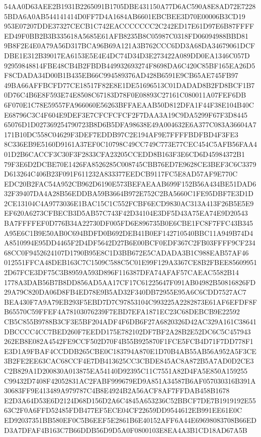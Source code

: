 \documentclass[UTF8,fontset=fandol,zihao=-4,a4paper]{ctexart}
\begin{document}
{{54AA0D63AEE2B1931B2265091B1705DBE431150A77D6AC590A8E8AD72E72285BDA6A0AB544141414D0FF7D4A1684AB6601EBCBEE3D70E00006B3CD19
953E07207DDE37327CECB1C742EACCCCCCC2C242ED17E61D97E6B87FFFFED49F0BB2B3B335618A5685E61AFB8235B8C05987C0318FD06094988BBD81
9B8F2E4E0A79A56D317BCA96B69A121A3B762CCC6DD3A68DA34679061DCFDBE1E312B39017EA6153E5E4E4DC74D34D3E273422A089DD0EA1346C057D
92959848814FBE48CB4B2FBDB449932693274F8698DA6C420C85BF165EA26D5F8CDADA34D00B1B435EB66C994589376AD428B6591E9CB65AE745FB97
49BA66AFFBCFD77CE18517F82E8E1DE51696513C01DADAD8B2FD8BCF1B70D76C4B6E8F593E74E8508C67183D78F0E08893C27161C080011A07FEF6DB
6F070E1C78E59557FA966060E56263BFFAEAAB50D812DFA1F44F38E104B40CE68796C3C4F604E9DEF3E7CFCFCFCF2F7DAA3A19C9DA5299F67F3D8445
65076D1D027369254790723B8D6B5DFA98638E49A004632E6A377C083A36604A7171B10DC558C04629F3DEF7EDDB97C2E194AF9E7FFFFBDFBD4F3FE3
8C336EB9E5160D9161A37EF0C10798C49CC749C773E77CEC454C5AFB56FAA401D2B6CACCF3C30F3F2833CFA23205CCEDD8B163F3E6CD6D45984372B1
79F3E6D2DCBE70E1426FA8526285C008745CBB76ED7E9628CE3BEF3C6C3379D613264C406B23F091F611232A833377EEDCB9117FC5E8AD57AF9E770C
EDC20B2FAC54A952CB962D6190E573BEFAEAAB699F152B56A434BE51DAD632F39407DA4A28B56EDDBA59B3664B972E752C2BA5660C1FE95DBF7E3D1D
2CE13104C4A9773036E1BAC15C1C552FCBF6ECD9830AC313A413F26B5E5E9EF620A6273CFBECB3D5AB57C743F42D34104E3DF5D43A75EA74E9D20543
BA7FFFFEF0D776B34A22730DF005FD6E896735B0E6CBE1FC8F7FFC43B345A95E6C1B9E50AB0C694BDFD0B692DEB41B0EF142710540BBC11A949B74D4
A8510994E95DD4465F2D4DF5642D27B6E00BCF0EDF367C2FB03FFFF9CF23468CC0F9452624107D1790B95E8C1D3BB672E5CADADA3B1C988EAB57AF46
012551FFCA48DEB163C7C1509C588C5C01E99F129A3367CE8B2FBEE856099512D67FCE3DF75C3B8959A593D896F116387DFA74AFAF57CAEAC5582B14
1778A3DAB56B7B8DD856AD5AA17CF17C61225647F091AB04982B50816826FD29A79C820DA06D8FB4ED78E9B5AD32F340DB72955E95A6C6CDD7527AC7
BEA430F7A9A79EB293F5EBD7D7C97853104C993225A2282873E61AF6EFDF8FB65570C59FFEF4A78103076239F7EBD7EFA1871EC23C68DEBCB9E22592
CB5C855B9788B3CF3E5BF204ADF4F6DB6F27A6820326D42AC329A161C38641DBCCCC4CC7BED260F7EEDD175E782102DF7BF2A28B2E52DC6C5C457943
262EB8E082A4542FE9CCF502D70F4B55B925870F1FCE5FCB4D71F7DD778F1E3D1A9FBAF4CCDDB265CBE0C183794A870E1D70B4AB55AB56A952A5F3CE
3B2FE2EE63CAC68CCF4E7DB413625CC3CBDE845AC8A872B5A7AD0D2CE3C2B829A1D200830A013875EA54140D92395C11C7551A82D4FA5E850A159255
C99432D7408F42052831AC2FABF999679ED9A851A34587B6AF057030316B391A30683FF9E413489A979787C4B8E4924B2A56ACF8AF7FFDAB458B1678
E2D3A64D53E6D2124D68D156D2A6C4845A653236C52BBCF7DE7B1919192E5563C2F0A6FFD52485FDB477EF5ECE04CF22659DD9544612EB991EE61E0C
ED92037351BB580EF0C5B6EEF5E2861B6E40152AFF6A44E69698083708B66EDD3A7DFAF4B163C7B66DDB56D9D5A0F0800103E8EA4A3B1CD18AD67A5B
}}
\end{document}
